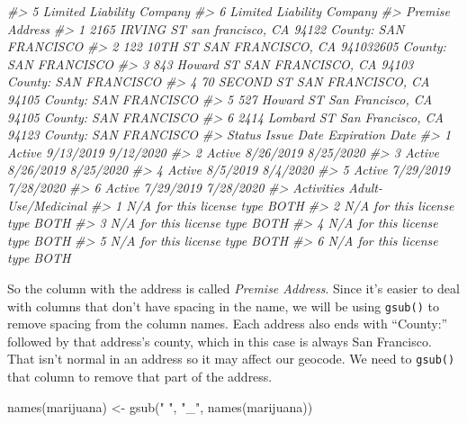 \documentclass[
  12pt,
  openany]{book}
\newenvironment{Shaded}{\begin{snugshade}}{\end{snugshade}}
\newcommand{\CommentTok}[1]{\textcolor[rgb]{0.37,0.37,0.37}{\textit{#1}}}
\newcommand{\FunctionTok}[1]{\textcolor[rgb]{0,0,0}{#1}}
\newcommand{\NormalTok}[1]{#1}
\newcommand{\OtherTok}[1]{\textcolor[rgb]{0.37,0.37,0.37}{#1}}
\newcommand{\StringTok}[1]{\textcolor[rgb]{0.5,0.5,0.5}{#1}}
\begin{document}
\begin{Shaded}
\begin{Highlighting}[]
\CommentTok{\#\textgreater{} 5 Limited Liability Company}
\CommentTok{\#\textgreater{} 6 Limited Liability Company}
\CommentTok{\#\textgreater{}                                                 Premise Address}
\CommentTok{\#\textgreater{} 1  2165 IRVING ST san francisco, CA 94122 County: SAN FRANCISCO}
\CommentTok{\#\textgreater{} 2 122 10TH ST SAN FRANCISCO, CA 941032605 County: SAN FRANCISCO}
\CommentTok{\#\textgreater{} 3   843 Howard ST SAN FRANCISCO, CA 94103 County: SAN FRANCISCO}
\CommentTok{\#\textgreater{} 4    70 SECOND ST SAN FRANCISCO, CA 94105 County: SAN FRANCISCO}
\CommentTok{\#\textgreater{} 5   527 Howard ST San Francisco, CA 94105 County: SAN FRANCISCO}
\CommentTok{\#\textgreater{} 6 2414 Lombard ST San Francisco, CA 94123 County: SAN FRANCISCO}
\CommentTok{\#\textgreater{}   Status Issue Date Expiration Date}
\CommentTok{\#\textgreater{} 1 Active  9/13/2019       9/12/2020}
\CommentTok{\#\textgreater{} 2 Active  8/26/2019       8/25/2020}
\CommentTok{\#\textgreater{} 3 Active  8/26/2019       8/25/2020}
\CommentTok{\#\textgreater{} 4 Active   8/5/2019        8/4/2020}
\CommentTok{\#\textgreater{} 5 Active  7/29/2019       7/28/2020}
\CommentTok{\#\textgreater{} 6 Active  7/29/2019       7/28/2020}
\CommentTok{\#\textgreater{}                  Activities Adult{-}Use/Medicinal}
\CommentTok{\#\textgreater{} 1 N/A for this license type                BOTH}
\CommentTok{\#\textgreater{} 2 N/A for this license type                BOTH}
\CommentTok{\#\textgreater{} 3 N/A for this license type                BOTH}
\CommentTok{\#\textgreater{} 4 N/A for this license type                BOTH}
\CommentTok{\#\textgreater{} 5 N/A for this license type                BOTH}
\CommentTok{\#\textgreater{} 6 N/A for this license type                BOTH}
\end{Highlighting}
\end{Shaded}

So the column with the address is called \emph{Premise Address}. Since it's easier to deal with columns that don't have spacing in the name, we will be using \texttt{gsub()} to remove spacing from the column names. Each address also ends with ``County:'' followed by that address's county, which in this case is always San Francisco. That isn't normal in an address so it may affect our geocode. We need to \texttt{gsub()} that column to remove that part of the address.

\begin{Shaded}
\begin{Highlighting}[]
\FunctionTok{names}\NormalTok{(marijuana) }\OtherTok{\textless{}{-}} \FunctionTok{gsub}\NormalTok{(}\StringTok{" "}\NormalTok{, }\StringTok{"\_"}\NormalTok{, }\FunctionTok{names}\NormalTok{(marijuana))}
\end{Highlighting}
\end{Shaded}
\end{document}
